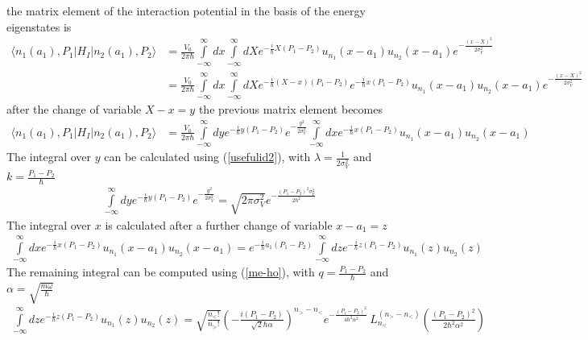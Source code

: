 the matrix element of the interaction potential in the basis of the energy eigenstates is
\begin{align}
  \langle n_1(a_1), P_1|H_I|n_2(a_1),P_2\rangle & = \frac{V_0}{2\pi\hbar}\int \limits_{-\infty}^{\infty} dx\int \limits_{-\infty}^{\infty} dX e^{-\frac{i}{\hbar}X(P_1-P_2)}u_{n_1}(x-a_1)u_{n_2}(x-a_1)e^{-\frac{(x-X)^2}{2\sigma_V^2}}\nonumber                         \\
                                                & =\frac{V_0}{2\pi\hbar}\int \limits_{-\infty}^{\infty} dx\int \limits_{-\infty}^{\infty} dX e^{-\frac{i}{\hbar}(X-x)(P_1-P_2)}e^{-\frac{i}{\hbar}x(P_1-P_2)}u_{n_1}(x-a_1)u_{n_2}(x-a_1)e^{-\frac{(x-X)^2}{2\sigma_V^2}}
\end{align}
after the change of variable $X-x=y$ the previous matrix element becomes
\begin{align}
  \langle n_1(a_1), P_1|H_I|n_2(a_1),P_2\rangle & = \frac{V_0}{2\pi\hbar}\int \limits_{-\infty}^{\infty} dy e^{-\frac{i}{\hbar}y(P_1-P_2)}e^{-\frac{y^2}{2\sigma_V^2}}\int \limits_{-\infty}^{\infty} dx e^{-\frac{i}{\hbar}x(P_1-P_2)}u_{n_1}(x-a_1)u_{n_2}(x-a_1)
\end{align}
The integral over $y$ can be calculated using (\ref{usefulid2}), with $\lambda = \frac1{2\sigma_V^2}$ and $k = \frac{P_1-P_2}{\hbar}$
\begin{align}
  \int \limits_{-\infty}^{\infty} dy e^{-\frac{i}{\hbar}y(P_1-P_2)}e^{-\frac{y^2}{2\sigma_V^2}} = \sqrt{{2\pi\sigma_V^2}} e^{-\frac{(P_1-P_2)^2\sigma_V^2}{2\hbar^2}}
\end{align}
The integral over $x$ is calculated after a further change of variable $x-a_1=z$
\begin{align}
  \int \limits_{-\infty}^{\infty} dx e^{-\frac{i}{\hbar}x(P_1-P_2)}u_{n_1}(x-a_1)u_{n_2}(x-a_1) = e^{-\frac{i}{\hbar}a_1(P_1-P_2)}\int \limits_{-\infty}^{\infty} dz e^{-\frac{i}{\hbar}z(P_1-P_2)}u_{n_1}(z)u_{n_2}(z)
\end{align}
The remaining integral can be computed using (\ref{me-ho}), with $q = \frac{P_1-P_2}{\hbar}$ and $\alpha = \sqrt{\frac{m\omega}{\hbar}}$
\begin{align}
  \int \limits_{-\infty}^{\infty} dz e^{-\frac{i}{\hbar}z(P_1-P_2)}u_{n_1}(z)u_{n_2}(z) = \sqrt{\frac{n_<!}{n_>!}} \left(-\frac{i (P_1-P_2)  }{\sqrt{2}\hbar\alpha}\right)^{n_> - n_<} e^{-\frac{(P_1-P_2)^2 }{4\hbar^2\alpha^2}} \, L_{n_<}^{(n_> - n_<)}\!\left(\frac{(P_1-P_2)^2 }{2\hbar^2\alpha^2}\right)
\end{align}

